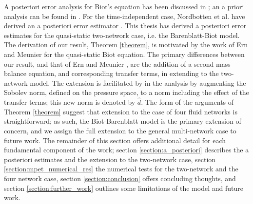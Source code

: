 A posteriori error analysis for Biot's equation has been discussed in \cite{meunier, riedlbeck}; an a priori analysis can be found in \cite{murad1, murad2, murad3}. For the time-independent case, Nordbotten et al. have derived an a posteriori error estimator \cite{nordbotten}. This thesis has derived a posteriori error estimates for the quasi-static two-network case, i.e. the Barenblatt-Biot model. The derivation of our result, Theorem \ref{theorem}, is motivated by the work of Ern and Meunier \cite{meunier} for the quasi-static Biot equation. The primary differences between our result, and that of Ern and Meunier \cite{meunier}, are the addition of a second mass balance equation, and corresponding transfer terms, in extending to the two-network model. The extension is facilitated by in the analysis by augmenting the Sobolev norm, defined on the pressure space, to a norm including the effect of the transfer terms; this new norm is denoted by $\hat{d}$. The form of the arguments of Theorem \ref{theorem} suggest that extension to the case of four fluid networks is straightforward; as such, the Biot-Barenblatt model is the primary extension of concern, and we assign the full extension to the general multi-network case to future work. The remainder of this section offers additional detail for each fundamental component of the work; section \ref{section:a_posteriori} describes the a posteriori estimates and the extension to the two-network case, section \ref{section:mpet_numerical_res} the numerical tests for the two-network and the four network case, section \ref{section:conclusion} offers concluding thoughts, and section \ref{section:further_work} outlines some limitations of the model and future work. 



